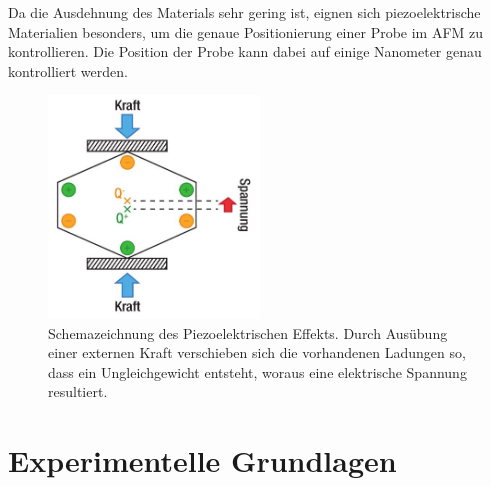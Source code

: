 Da die Ausdehnung des Materials sehr gering ist, eignen sich piezoelektrische Materialien besonders, um die genaue Positionierung einer Probe im AFM zu kontrollieren. Die Position der Probe kann dabei auf einige Nanometer genau kontrolliert werden.
\begin{figure}
  \centering
  \includegraphics[width=0.5\textwidth]{content/plots/Piezo.jpg}
  \caption{Schemazeichnung des Piezoelektrischen Effekts. Durch Ausübung einer externen Kraft verschieben sich die vorhandenen Ladungen so, dass ein Ungleichgewicht entsteht, woraus eine elektrische Spannung resultiert.\cite{afm_datasheet}}
  \label{fig:piezo}
\end{figure}
%
\section{Experimentelle Grundlagen}
